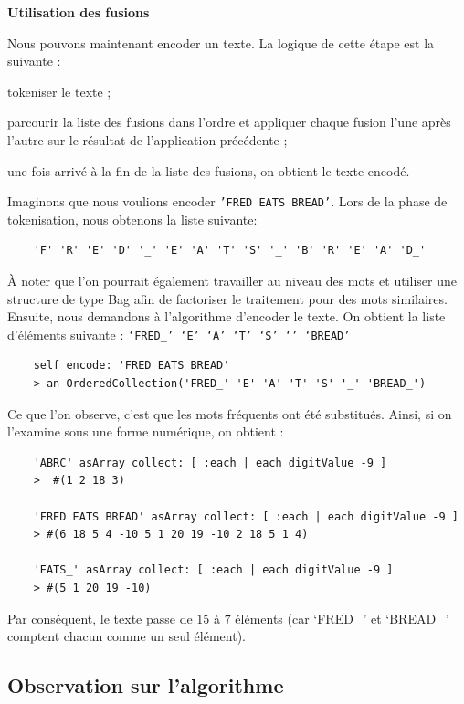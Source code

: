 \documentclass[12pt,a4paper]{report}
\begin{document}
\textbf{Utilisation des fusions}

Nous pouvons maintenant encoder un texte. La logique de cette étape est la suivante :

\begin{itemizeFB}
	\item tokeniser le texte ;
	\item parcourir la liste des fusions dans l’ordre et appliquer chaque fusion l’une après l’autre sur le résultat de l’application précédente ;
	\item une fois arrivé à la fin de la liste des fusions, on obtient le texte encodé.
\end{itemizeFB}

Imaginons que nous voulions encoder \texttt{'FRED EATS BREAD'}. Lors de la phase de tokenisation, nous obtenons la liste suivante:

\begin{verbatim}
	'F' 'R' 'E' 'D' '_' 'E' 'A' 'T' 'S' '_' 'B' 'R' 'E' 'A' 'D_'
\end{verbatim}

À noter que l’on pourrait également travailler au niveau des mots et utiliser une structure de type Bag afin de factoriser le traitement pour des mots similaires.\\
Ensuite, nous demandons à l’algorithme d’encoder le texte. On obtient la liste d’éléments suivante : \texttt{‘FRED\_’ ‘E’ ‘A’ ‘T’ ‘S’ ‘’ ‘BREAD’}

\begin{verbatim}
	self encode: 'FRED EATS BREAD' 
	> an OrderedCollection('FRED_' 'E' 'A' 'T' 'S' '_' 'BREAD_')
\end{verbatim}

Ce que l’on observe, c’est que les mots fréquents ont été substitués. Ainsi, si on l’examine sous une forme numérique, on obtient :

\begin{verbatim}
	'ABRC' asArray collect: [ :each | each digitValue -9 ]
	>  #(1 2 18 3)

	'FRED EATS BREAD' asArray collect: [ :each | each digitValue -9 ] 
	> #(6 18 5 4 -10 5 1 20 19 -10 2 18 5 1 4)

	'EATS_' asArray collect: [ :each | each digitValue -9 ] 
	> #(5 1 20 19 -10) 
\end{verbatim}

Par conséquent, le texte passe de $15$ à $7$ éléments (car ‘FRED\_’ et ‘BREAD\_’ comptent chacun comme un seul élément).

\subsection{Observation sur l'algorithme}
\end{document}
